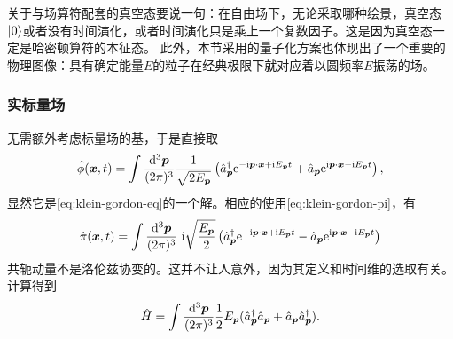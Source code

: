 \documentclass[hyperref, UTF8, a4paper]{ctexart}
\newcommand*{\ii}{\mathrm{i}}
\newcommand*{\ee}{\mathrm{e}}
\begin{document}
关于与场算符配套的真空态要说一句：在自由场下，无论采取哪种绘景，真空态$\ket{0}$或者没有时间演化，或者时间演化只是乘上一个复数因子。这是因为真空态一定是哈密顿算符的本征态。
此外，本节采用的量子化方案也体现出了一个重要的物理图像：具有确定能量$E$的粒子在经典极限下就对应着以圆频率$E$振荡的场。

\subsubsection{实标量场}

无需额外考虑标量场的基，于是直接取
\begin{equation}
    \hat{\phi}(\vb*{x}, t) = \int \frac{\dd[3]{\vb*{p}}}{(2\pi)^3} \frac{1}{\sqrt{2 E_{\vb*{p}}}} \left( \hat{a}^\dagger_{\vb*{p}} \ee^{ - \ii \vb*{p} \cdot \vb*{x} + \ii E_{\vb*{p}} t} + \hat{a}_{\vb*{p}} \ee^{ \ii \vb*{p} \cdot \vb*{x} - \ii E_{\vb*{p}} t} \right),
    \label{eq:expanding-klein-gordon-field}
\end{equation}
显然它是\eqref{eq:klein-gordon-eq}的一个解。相应的使用\eqref{eq:klein-gordon-pi}，有
\begin{equation}
    \hat{\pi}(\vb*{x}, t) = \int \frac{\dd[3]{\vb*{p}}}{(2\pi)^3} \  \ii \sqrt{\frac{E_{\vb*{p}}}{2}} \left( \hat{a}^\dagger_{\vb*{p}} \ee^{ - \ii \vb*{p} \cdot \vb*{x} + \ii E_{\vb*{p}} t} - \hat{a}_{\vb*{p}} \ee^{ \ii \vb*{p} \cdot \vb*{x} - \ii E_{\vb*{p}} t} \right)
\end{equation}
共轭动量不是洛伦兹协变的。这并不让人意外，因为其定义和时间维的选取有关。
计算得到
\[
    \hat{H} = \int \frac{\dd[3]{\vb*{p}}}{(2\pi)^3} \frac{1}{2} E_{\vb*{p}} (\hat{a}_{\vb*{p}}^\dagger \hat{a}_{\vb*{p}} + \hat{a}_{\vb*{p}} \hat{a}^\dagger_{\vb*{p}}).
\]
\end{document}
